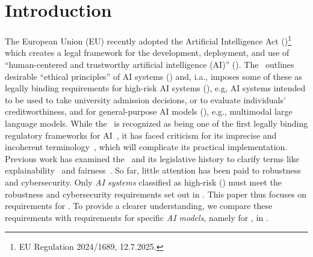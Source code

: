 \section{Introduction}\label{sec:intro}
% 
The European Union (EU) recently adopted the Artificial Intelligence Act (\EUAIAct)\footnote{EU Regulation 2024/1689, 12.7.2025.} which creates a legal framework for the development, deployment, and use of ``human-centered and trustworthy artificial intelligence (AI)'' ().
% 
The \EUAIAct\ outlines 
desirable ``ethical principles'' of AI systems () and, i.a., imposes some of these as legally binding requirements for high-risk AI systems (\HRAIS), e.g, AI systems intended to be used to take university admission decisions, or to evaluate individuals' creditworthiness, and for general-purpose AI models (\GPAIMS), e.g., multimodal large language models.
% 
While the \EUAIAct\ is recognized as being one of the first legally binding regulatory frameworks for AI~\citep{Chee_Hummel_2024}, it has faced criticism for its imprecise and incoherent terminology~\citep{laux2024trustworthy, bomhard2024AIAct}, which will complicate its practical implementation. 
Previous work has examined the \EUAIAct\ and its legislative history to clarify terms like explainability~\citep{bordt2022post, vitali2022survey, pavlidis2024unlocking} and fairness~\citep{deck2024implications}. So far, little attention has been paid to robustness and cybersecurity.
% 
Only \emph{AI systems} classified as high-risk (\HRAIS) must meet the robustness and cybersecurity requirements set out in . This paper thus focuses on requirements for \HRAIS. To provide a clearer understanding, we compare these requirements with requirements for specific \emph{AI models}, namely for \GPAIMSSR, in .
% 



